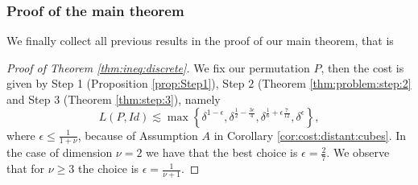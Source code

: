 \documentclass[12 pt]{article}
\theoremstyle{definition} \newtheorem{definition}{Definition}[section]
\theoremstyle{definition} \newtheorem{remark}[definition]{Remark}
\theoremstyle{plain} \newtheorem{lemma}[definition]{Lemma}
\theoremstyle{plain} \newtheorem{proposition}[definition]{Proposition}
\theoremstyle{plain} \newtheorem{theorem}[definition]{Theorem}
\theoremstyle{plain} \newtheorem{corollary}[definition]{Corollary}
\theoremstyle{definition} \newtheorem{example}[definition]{Example}
\theoremstyle{definition} \newtheorem{assumption}[definition]{Assumption}
\theoremstyle{definition} \newtheorem{conjecture}[definition]{Conjecture}
\newcommand{\1}{\mathbbm 1}
\numberwithin{equation}{section}
\begin{document}
\subsubsection{Proof of the main theorem}
We finally collect all previous results in the proof of our main theorem, that is
\begin{proof}[Proof of Theorem \ref{thm:ineq:discrete}]
    We fix our permutation $P$, then the cost is given by Step 1 (Proposition \ref{prop:Step1}), Step $2$ (Theorem \ref{thm:problem:step:2} and Step $3$ (Theorem \ref{thm:step:3}), namely 
    \begin{equation*}
        L(P,Id)\lesssim \max\left\lbrace \delta^{1-\epsilon}, \delta^{\frac{1}{2}-\frac{3\epsilon}{4}},\delta^{\frac{1}{6}+\epsilon\frac{7}{12}}, \delta^{\epsilon}\right\rbrace,
    \end{equation*}
    where $\epsilon\leq\frac{1}{1+\nu}$, because of Assumption $A$ in Corollary \ref{cor:cost:distant:cubes}. In the case of dimension $\nu=2$ we have that the best choice is $\epsilon=\frac{2}{7}$. We observe that for $\nu\geq 3$ the choice is $\epsilon=\frac{1}{\nu+1}$. 
   
\end{proof}
\end{document}
